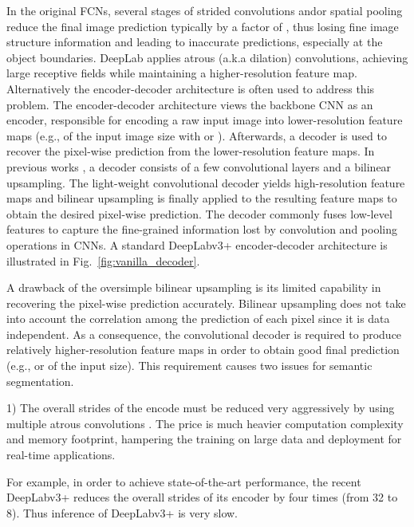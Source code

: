 \documentclass[10pt,twocolumn,letterpaper]{article}
\newcommand{\1}{{\mathbbm{1}}}
\begin{document}
In the original FCNs, several stages of strided convolutions andor spatial
pooling reduce the final image
prediction typically by a factor of , thus losing fine image structure information and leading to inaccurate predictions, especially at the object boundaries.
DeepLab \cite{chen2018deeplab} applies atrous (a.k.a dilation) convolutions, achieving large receptive fields while maintaining a higher-resolution feature map.
Alternatively the encoder-decoder architecture is often used to  address this  problem. The encoder-decoder architecture views the backbone CNN as an encoder, responsible for encoding a raw input image into lower-resolution feature maps (e.g.,  of the input image size with   or ). Afterwards, a decoder is used to recover the pixel-wise prediction from the lower-resolution feature maps. In previous works \cite{chen2018encoder, lin2017refinenet}, a decoder consists of a few convolutional layers
and a bilinear upsampling. The light-weight convolutional decoder yields high-resolution feature maps and  bilinear upsampling  is finally applied to the resulting feature maps to obtain the desired pixel-wise prediction. The decoder commonly fuses low-level features to capture the fine-grained information lost by convolution and pooling operations in CNNs. A standard DeepLabv3+ encoder-decoder architecture is illustrated in Fig.~\ref{fig:vanilla_decoder}.



A drawback of the oversimple bilinear upsampling  is  its
limited capability
in recovering the pixel-wise prediction accurately.
Bilinear upsampling
does not take into account the correlation among the prediction of each pixel since it is data independent.
As a consequence,  the convolutional decoder is required to produce
relatively higher-resolution feature maps in order to obtain good final prediction (e.g.,  or  of the input size).
This requirement causes two
issues for semantic segmentation.

1) The overall strides of the encode  must be reduced
very aggressively by using
 multiple atrous convolutions \cite{chen2018deeplab, yu2015multi}.
The price is much heavier
  computation complexity and memory footprint,
  hampering the training on large data and deployment for real-time applications.



  For example, in order to achieve  state-of-the-art performance, the recent DeepLabv3+ \cite{chen2018encoder} reduces the overall strides of its encoder by four times (from 32 to 8). Thus  inference of DeepLabv3+ is very slow.
\end{document}
